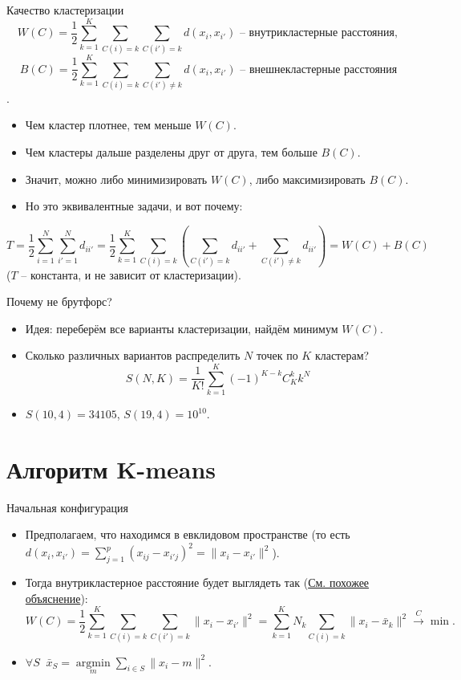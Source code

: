\documentclass[9pt]{beamer}
\begin{document}
\begin{frame}{Качество кластеризации}
$$W(C) = \frac{1}{2}\sum_{k=1}^K\sum_{C(i)=k}\sum_{C(i')=k}d(x_i, x_{i'}) \text{ -- внутрикластерные расстояния},$$
$$B(C) = \frac{1}{2}\sum_{k=1}^K\sum_{C(i)=k}\sum_{C(i')\neq k}d(x_i, x_{i'}) \text{ -- внешнекластерные расстояния}$$.

\begin{itemize}
    \item Чем кластер плотнее, тем меньше $W(C)$.
    \item Чем кластеры дальше разделены друг от друга, тем больше $B(C)$.
    \item Значит, можно либо минимизировать $W(C)$, либо максимизировать $B(C)$.
    \item Но это эквивалентные задачи, и вот почему:
\end{itemize}
$$T = \frac{1}{2}\sum_{i=1}^N\sum_{i'=1}^N d_{ii'} = \frac{1}{2}\sum_{k=1}^K\sum_{C(i)=k}\left(\sum_{C(i')=k} d_{ii'} + \sum_{C(i')\neq k} d_{ii'} \right) = W(C) + B(C)$$
\;\;\;\;\;($T$ -- константа, и не зависит от кластеризации).
    
\end{frame}

\begin{frame}{Почему не брутфорс?}
\begin{itemize}
    \item Идея: переберём все варианты кластеризации, найдём минимум $W(C)$.
    \item Сколько различных вариантов распределить $N$ точек по $K$ кластерам?
    $$S(N, K) = \frac{1}{K!}\sum_{k=1}^K(-1)^{K-k}C_K^k k^N$$
    \item $S(10, 4) = 34105$, $S(19, 4)=10^{10}.$
\end{itemize}
\end{frame}

\section{Алгоритм K-means}

\begin{frame}{Начальная конфигурация}
\begin{itemize}
    \item Предполагаем, что находимся в евклидовом пространстве (то есть $d(x_i, x_{i'}) = \sum\limits_{j=1}^p (x_{ij} - x_{i'j})^2 = \|x_i-x_{i'}\|^2$).
    \item Тогда внутрикластерное расстояние будет выглядеть так (\href{https://en.wikipedia.org/wiki/Variance\#Population_variance}{См. похожее объяснение}):
    $$W(C) = \frac{1}{2}\sum_{k=1}^K\sum_{C(i)=k}\sum_{C(i')=k}\|x_i - x_{i'}\|^2 = \sum_{k=1}^K N_k\sum_{C(i)=k} \|x_i-\bar x_k\|^2\xrightarrow{C} \min.$$
    \item $\forall S \;\;\bar x_S = \underset{m}{\operatorname{argmin}}\sum\limits_{i\in S}\|x_i-m\|^2.$
\end{itemize}
    
\end{frame}
\end{document}
